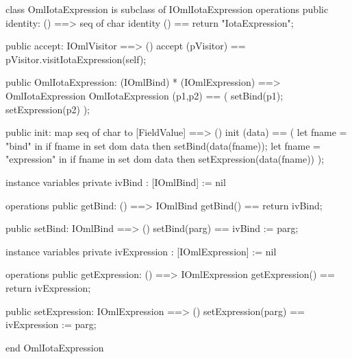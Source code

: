 \begin{vdm_al}
class OmlIotaExpression is subclass of IOmlIotaExpression
operations
  public identity: () ==> seq of char
  identity () == return "IotaExpression";

  public accept: IOmlVisitor ==> ()
  accept (pVisitor) == pVisitor.visitIotaExpression(self);

  public OmlIotaExpression:
      (IOmlBind) *
      (IOmlExpression) ==> OmlIotaExpression
  OmlIotaExpression (p1,p2) == 
   ( setBind(p1);
     setExpression(p2) );

  public init: map seq of char to [FieldValue] ==> ()
  init (data) ==
    ( let fname = "bind" in
        if fname in set dom data
        then setBind(data(fname));
      let fname = "expression" in
        if fname in set dom data
        then setExpression(data(fname)) );

instance variables
  private ivBind : [IOmlBind] := nil

operations
  public getBind: () ==> IOmlBind
  getBind() == return ivBind;

  public setBind: IOmlBind ==> ()
  setBind(parg) == ivBind := parg;

instance variables
  private ivExpression : [IOmlExpression] := nil

operations
  public getExpression: () ==> IOmlExpression
  getExpression() == return ivExpression;

  public setExpression: IOmlExpression ==> ()
  setExpression(parg) == ivExpression := parg;

end OmlIotaExpression
\end{vdm_al}

